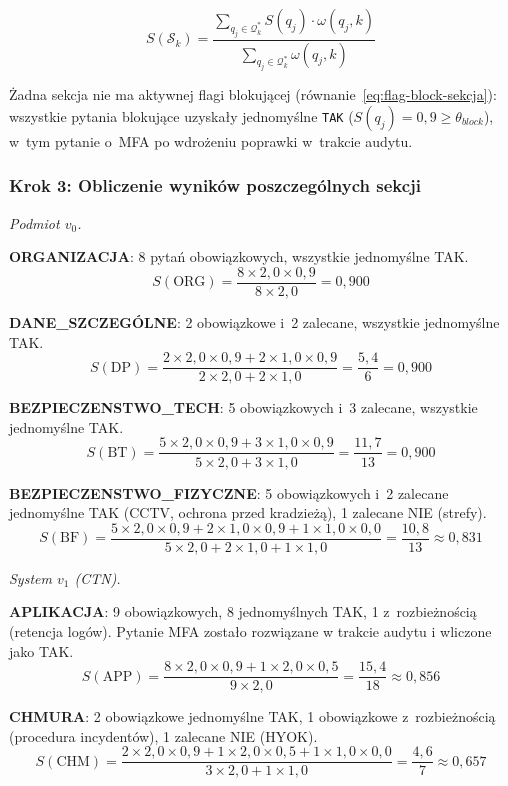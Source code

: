 \[
S(\mathcal{S}_k) =
\frac{\sum_{q_j \in \mathcal{Q}^{*}_k} S(q_j) \cdot \omega(q_j, k)}
     {\sum_{q_j \in \mathcal{Q}^{*}_k} \omega(q_j, k)}
\]

\noindent Żadna sekcja nie ma aktywnej flagi blokującej (równanie~\eqref{eq:flag-block-sekcja}): wszystkie pytania blokujące uzyskały jednomyślne \texttt{TAK} ($S(q_j) = 0{,}9 \geq \theta_{block}$), w~tym pytanie o~MFA po wdrożeniu poprawki w~trakcie audytu.

\subsubsection*{Krok 3: Obliczenie wyników poszczególnych sekcji}

\noindent\textit{Podmiot $v_0$.}

\textbf{ORGANIZACJA}: 8 pytań obowiązkowych, wszystkie jednomyślne TAK.
\[
S(\text{ORG}) = \frac{8 \times 2{,}0 \times 0{,}9}{8 \times 2{,}0} = 0{,}900
\]

\textbf{DANE\_SZCZEGÓLNE}: 2 obowiązkowe i~2 zalecane, wszystkie jednomyślne TAK.
\[
S(\text{DP}) = \frac{2 \times 2{,}0 \times 0{,}9 + 2 \times 1{,}0 \times 0{,}9}{2 \times 2{,}0 + 2 \times 1{,}0} = \frac{5{,}4}{6} = 0{,}900
\]

\textbf{BEZPIECZENSTWO\_TECH}: 5 obowiązkowych i~3 zalecane, wszystkie jednomyślne TAK.
\[
S(\text{BT}) = \frac{5 \times 2{,}0 \times 0{,}9 + 3 \times 1{,}0 \times 0{,}9}{5 \times 2{,}0 + 3 \times 1{,}0} = \frac{11{,}7}{13} = 0{,}900
\]

\textbf{BEZPIECZENSTWO\_FIZYCZNE}: 5 obowiązkowych i~2 zalecane jednomyślne TAK (CCTV, ochrona przed kradzieżą), 1 zalecane NIE (strefy).
\[
S(\text{BF}) = \frac{5 \times 2{,}0 \times 0{,}9 + 2 \times 1{,}0 \times 0{,}9 + 1 \times 1{,}0 \times 0{,}0}{5 \times 2{,}0 + 2 \times 1{,}0 + 1 \times 1{,}0} = \frac{10{,}8}{13} \approx 0{,}831
\]

\noindent\textit{System $v_1$ (CTN).}

\textbf{APLIKACJA}: 9 obowiązkowych, 8 jednomyślnych TAK, 1 z~rozbieżnością (retencja logów). Pytanie MFA zostało rozwiązane w trakcie audytu i wliczone jako TAK.
\[
S(\text{APP}) = \frac{8 \times 2{,}0 \times 0{,}9 + 1 \times 2{,}0 \times 0{,}5}{9 \times 2{,}0} = \frac{15{,}4}{18} \approx 0{,}856
\]

\textbf{CHMURA}: 2 obowiązkowe jednomyślne TAK, 1 obowiązkowe z~rozbieżnością (procedura incydentów), 1 zalecane NIE (HYOK).
\[
S(\text{CHM}) = \frac{2 \times 2{,}0 \times 0{,}9 + 1 \times 2{,}0 \times 0{,}5 + 1 \times 1{,}0 \times 0{,}0}{3 \times 2{,}0 + 1 \times 1{,}0} = \frac{4{,}6}{7} \approx 0{,}657
\]

